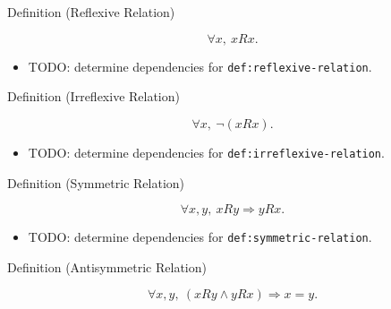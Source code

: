\begin{definitionbox}{Definition (Reflexive Relation)}
\begin{definition}
\label{def:reflexive-relation}
\[
\forall x,\ xRx.
\]
\end{definition}
\end{definitionbox}

\begin{dependencies}
\begin{itemize}
  \item TODO: determine dependencies for \texttt{def:reflexive-relation}.
\end{itemize}
\end{dependencies}

\begin{definitionbox}{Definition (Irreflexive Relation)}
\begin{definition}
\label{def:irreflexive-relation}
\[
\forall x,\ \neg(xRx).
\]
\end{definition}
\end{definitionbox}

\begin{dependencies}
\begin{itemize}
  \item TODO: determine dependencies for \texttt{def:irreflexive-relation}.
\end{itemize}
\end{dependencies}

\begin{definitionbox}{Definition (Symmetric Relation)}
\begin{definition}
\label{def:symmetric-relation}
\[
\forall x,y,\ xRy \Longrightarrow yRx.
\]
\end{definition}
\end{definitionbox}

\begin{dependencies}
\begin{itemize}
  \item TODO: determine dependencies for \texttt{def:symmetric-relation}.
\end{itemize}
\end{dependencies}

\begin{definitionbox}{Definition (Antisymmetric Relation)}
\begin{definition}
\label{def:antisymmetric-relation}
\[
\forall x,y,\ (xRy\land yRx)\Longrightarrow x=y.
\]
\end{definition}
\end{definitionbox}

